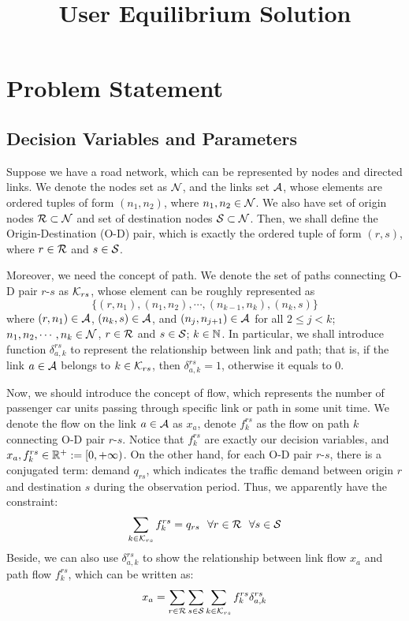 \documentclass{article}
\title{User Equilibrium Solution}
\begin{document}
\maketitle


\section{Problem Statement}

\subsection{Decision Variables and Parameters}

Suppose we have a road network, which can be represented by nodes and directed links. We denote the nodes set as $ \mathcal{N} $, and the links set $ \mathcal{A} $, whose elements are ordered tuples of form $ (n_1, n_2) $, where $ n_1, n_2 \in \mathcal{N} $. We also have set of origin nodes $ \mathcal{R} \subset \mathcal{N} $ and set of destination nodes $ \mathcal{S} \subset \mathcal{N} $. Then, we shall define the Origin-Destination (O-D) pair, which is exactly the ordered tuple of form $ (r, s) $, where $ r \in \mathcal{R} $ and $ s \in \mathcal{S} $.

Moreover, we need the concept of path. We denote the set of paths connecting O-D pair $ r $-$ s $ as $ \mathcal{K}_{rs} $, whose element can be roughly represented as
$$ \{ (r, n_1), (n_1, n_2), \cdots, (n_{k-1}, n_k), (n_k, s) \} $$ 
where $ (r, n_1) \in \mathcal{A} $, $ (n_k, s) \in \mathcal{A} $, and $ (n_j, n_{j+1}) \in \mathcal{A} $ for all $ 2 \le j < k $; $ n_1, n_2, \cdots, n_k \in \mathcal{N} $, $ r \in \mathcal{R} $ and $ s \in \mathcal{S} $; $ k \in \mathbb{N} $. In particular, we shall introduce function $ \delta_{a, k}^{rs} $ to represent the relationship between link and path; that is, if the link $ a \in \mathcal{A} $ belongs to $ k \in \mathcal{K}_{rs} $, then $ \delta_{a, k}^{rs} = 1 $, otherwise it equals to $ 0 $.

Now, we should introduce the concept of flow, which represents the number of passenger car units passing through specific link or path in some unit time. We denote the flow on the link $ a \in \mathcal{A} $ as $ x_a $, denote $ f_k^{rs} $ as the flow on path $ k $ connecting O-D pair $ r $-$ s $. Notice that $ f_k^{rs} $ are exactly our decision variables, and $ x_a, f_k^{rs} \in \mathbb{R}^+ := [0, + \infty) $. On the other hand, for each O-D pair $ r $-$ s $, there is a conjugated term: demand $ q_{rs} $, which indicates the traffic demand between origin $ r $ and destination $ s $ during the observation period. Thus, we apparently have the constraint: 
$$ \sum_{k \in \mathcal{K}_{rs}} f_{k}^{rs} = q_{rs} ~~ \forall r \in \mathcal{R} ~~ \forall s \in \mathcal{S} $$
Beside, we can also use $ \delta_{a, k}^{rs} $ to show the relationship between link flow $ x_a $ and path flow $ f_k^{rs} $, which can be written as: 
\begin{equation} \label{eq-path-flow-to-link-flow}
    x_a = \sum_{r \in \mathcal{R}} \sum_{s \in \mathcal{S}} \sum_{k \in \mathcal{K}_{rs}} f_{k}^{rs} \delta_{a, k}^{rs} 
\end{equation}
\end{document}
